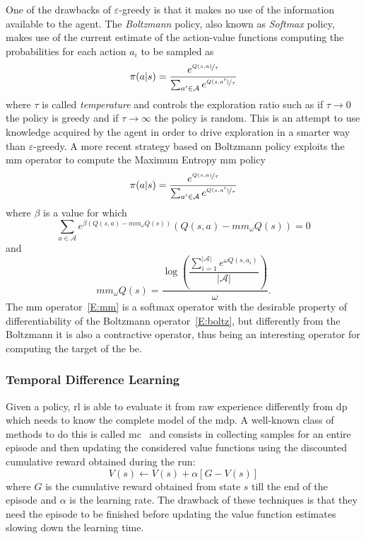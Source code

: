 One of the drawbacks of $\varepsilon$-greedy is that it makes no use of the information available to the agent. The \textit{Boltzmann} policy, also known as \textit{Softmax} policy, makes use of the current estimate of the action-value functions computing the probabilities for each action $a_i$ to be sampled as
\begin{equation}\label{E:boltz}
 \pi(a | s) = \dfrac{e^{\nicefrac{Q(s,a)}{\tau}}}{\sum_{a' \in \mathcal{A}}e^{\nicefrac{Q(s,a')}{\tau}}}
\end{equation}
where $\tau$ is called \textit{temperature} and controls the exploration ratio such as if $\tau \to 0$ the policy is greedy and if $\tau \to \infty$ the policy is random. This is an attempt to use knowledge acquired by the agent in order to drive exploration in a smarter way than $\varepsilon$-greedy. A more recent strategy based on Boltzmann policy exploits the \gls{mm} operator to compute the Maximum Entropy \gls{mm} policy~\cite{asadi2016alternative}
\begin{equation}
 \pi(a | s) = \dfrac{e^{\nicefrac{Q(s,a)}{\tau}}}{\sum_{a' \in \mathcal{A}}e^{\nicefrac{Q(s,a')}{\tau}}}
\end{equation}
where $\beta$ is a value for which
\begin{equation}
 \sum_{a \in \mathcal{A}} e^{\beta(Q(s,a) - mm_\omega Q(s))}(Q(s,a)-mm_\omega Q(s))=0
\end{equation}
and
\begin{equation}\label{E:mm}
 mm_\omega Q(s) = \dfrac{\log(\dfrac{\sum_{i=1}^{|\mathcal{A}|}e^{\omega Q(s,a_i)}}{|\mathcal{A}|})}{\omega}.
\end{equation}
The \gls{mm} operator~\ref{E:mm} is a softmax operator with the desirable property of differentiability of the Boltzmann operator~\ref{E:boltz}, but differently from the Boltzmann it is also a contractive operator, thus being an interesting operator for computing the target of the \gls{be}. 

\subsubsection{Temporal Difference Learning}
Given a policy, \gls{rl} is able to evaluate it from raw experience differently from \gls{dp} which needs to know the complete model of the \gls{mdp}. A well-known class of methods to do this is called \gls{mc}~\cite{robert2013monte} and consists in collecting samples for an entire episode and then updating the considered value functions using the discounted cumulative reward obtained during the run:
\begin{equation}\label{E:mc}
 V(s) \gets V(s) + \alpha [G - V(s)]
\end{equation}
where $G$ is the cumulative reward obtained from state $s$ till the end of the episode and $\alpha$ is the learning rate.
The drawback of these techniques is that they need the episode to be finished before updating the value function estimates slowing down the learning time.

